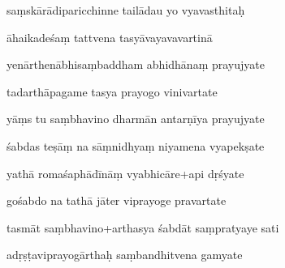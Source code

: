 \documentclass[article,12pt,a4paper]{memoir}%
\newcounter{parCount}
\begin{document}
	  
	  \pstart {} saṃskārādiparicchinne tailādau yo vyavasthitaḥ 
	{}
	\pend%
      

	  
	  \pstart \leavevmode%
	āhaikadeśaṃ tattvena tasyāvayavavartinā 
	{}
	\pend%
      

	  
	  \pstart {} yenārthenābhisaṃbaddham abhidhānaṃ prayujyate 
	{}
	\pend%
      

	  
	  \pstart \leavevmode%
	tadarthāpagame tasya prayogo vinivartate 
	{}
	\pend%
      

	  
	  \pstart {} yāṃs tu saṃbhavino dharmān antarṇīya prayujyate 
	{}
	\pend%
      

	  
	  \pstart \leavevmode%
	śabdas teṣāṃ na sāṃnidhyaṃ niyamena vyapekṣate 
	{}
	\pend%
      

	  
	  \pstart {} yathā romaśaphādīnāṃ vyabhicāre+api dṛśyate 
	{}
	\pend%
      

	  
	  \pstart \leavevmode%
	gośabdo na tathā jāter viprayoge pravartate 
	{}
	\pend%
      

	  
	  \pstart {} tasmāt saṃbhavino+arthasya śabdāt saṃpratyaye sati 
	{}
	\pend%
      

	  
	  \pstart \leavevmode%
	adṛṣṭaviprayogārthaḥ saṃbandhitvena gamyate 
	{}
	\pend%
      
\end{document}
